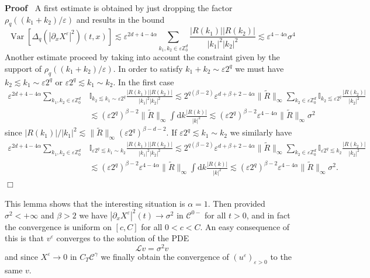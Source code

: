 \documentclass[a4paper,11pt]{article}
\newcommand{\mathd}{\mathrm{d}}
\newcommand{\tmop}[1]{\ensuremath{\operatorname{#1}}}
\newenvironment{proof}{\noindent\textbf{Proof\ }}{\hspace*{\fill}$\Box$\medskip}
\newcommand{\LL}{\mathscr{L}}
\newcommand{\CC}{\mathscr{C}}
\begin{document}
\begin{proof}
A first estimate is obtained by just dropping the factor $ \rho_q ((k_1 + k_2) / \varepsilon)$ and results in the bound
\[
\tmop{Var} [\Delta_q (| \partial_x X^{\varepsilon} |^2) (t, x)] \lesssim
     \varepsilon^{2 d + 4 - 4 \alpha} \sum_{k_1, k_2 \in \varepsilon
     \mathbb{Z}^d_0} \frac{| R (k_1) |
     | R (k_2) |}{| k_1 |^2  | k_2 |^2} \lesssim    \varepsilon^{ 4 - 4 \alpha} \sigma^4
\]
Another estimate proceed by taking into account the constraint given by the support of  $ \rho_q ((k_1 + k_2) / \varepsilon)$. In
 order to satisfy $k_1 + k_2 \sim \varepsilon 2^q$ we must have $k_2
  \lesssim k_1 \sim \varepsilon 2^q$ or $\varepsilon 2^q \lesssim k_1 \sim
  k_2$. In the first case
  \begin{align*}
     \varepsilon^{2 d + 4 - 4 \alpha} \sum_{k_1, k_2 \in \varepsilon \mathbb{Z}^d_0} & \mathbb{I}_{k_2 \lesssim k_1 \sim \varepsilon 2^q} \frac{| R (k_1) |  | R (k_2) |}{| k_1 |^2  | k_2 |^2}  \lesssim 2^{q(\beta-2)} \varepsilon^{ d  + \beta+ 2 - 4 \alpha} \| \tilde R \|_{\infty} \sum_{k_2 \in \varepsilon \mathbb{Z}^d_0} \mathbb{I}_{k_2 \lesssim \varepsilon 2^q} \frac{| R (k_2) |}{| k_2 |^2} \\
     & \lesssim (\varepsilon 2^q)^{\beta - 2} \| \tilde R \|_{\infty} \int \mathd k  \frac{| R (k) |}{| k |^2} \lesssim  (\varepsilon 2^q)^{\beta - 2} \varepsilon^{4 - 4 \alpha} \| \tilde R \|_{\infty} \sigma^2
  \end{align*}
  since $| R (k_1) | / | k_1 |^2 \lesssim \| \tilde R \|_{\infty} (\varepsilon 2^q)^{\beta-d-2}$. If $\varepsilon 2^q \lesssim k_1 \sim k_2$ we similarly have
  \begin{align*}
     \varepsilon^{2 d + 4 - 4 \alpha} \sum_{k_1, k_2 \in \varepsilon \mathbb{Z}^d_0} & \mathbb{I}_{\varepsilon 2^q \lesssim k_1 \sim k_2} \frac{| R (k_1) |  | R (k_2) |}{| k_1 |^2  | k_2 |^2} \lesssim 2^{q(\beta-2)} \varepsilon^{d +\beta + 2 - 4 \alpha} \|\tilde R \|_{\infty} \sum_{k_2 \in \varepsilon \mathbb{Z}^d_0} \mathbb{I}_{\varepsilon 2^q \lesssim k_2} \frac{ | R (k_2) |}{ | k_2 |^2} \\
     & \lesssim  (\varepsilon 2^q)^{\beta - 2} \varepsilon^{4 - 4 \alpha} \| \tilde R \|_{\infty} \int \mathd k \frac{| R (k) |}{| k |^2}
       \lesssim  (\varepsilon 2^q)^{\beta - 2} \varepsilon^{4 - 4 \alpha} \| \tilde R \|_{\infty} \sigma^2.
  \end{align*}
\end{proof}

This lemma shows that the interesting situation is $\alpha = 1$. Then provided
$\sigma^2 < + \infty$ and $\beta > 2$ we have $| \partial_x X^{\varepsilon} |^2
(t) \rightarrow \sigma^2$ in $\CC^{0 -}$ for all $t > 0$, and in fact the
convergence is uniform on $[c, C]$ for all $0 < c < C$. An easy consequence of
this is that $v^{\varepsilon}$ converges to the solution of the PDE
\begin{equation}
  \LL v = \sigma^2 v \label{eq:homog}
\end{equation}
and since $X^{\varepsilon} \rightarrow 0$ in $C_T \CC^{\gamma}$ we finally
obtain the convergence of $(u^{\varepsilon})_{\varepsilon > 0}$ to the same
$v$.
\end{document}
